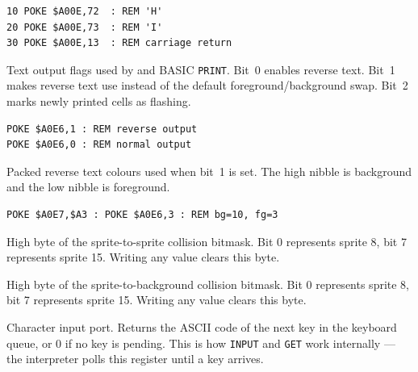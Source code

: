 \begin{lstlisting}
10 POKE $A00E,72  : REM 'H'
20 POKE $A00E,73  : REM 'I'
30 POKE $A00E,13  : REM carriage return
\end{lstlisting}



Text output flags used by  and BASIC \texttt{PRINT}. Bit~0 enables
reverse text. Bit~1 makes reverse text use  instead of the default
foreground/background swap. Bit~2 marks newly printed cells as flashing.

\begin{lstlisting}
POKE $A0E6,1 : REM reverse output
POKE $A0E6,0 : REM normal output
\end{lstlisting}



Packed reverse text colours used when  bit~1 is set. The high
nibble is background and the low nibble is foreground.

\begin{lstlisting}
POKE $A0E7,$A3 : POKE $A0E6,3 : REM bg=10, fg=3
\end{lstlisting}



High byte of the sprite-to-sprite collision bitmask.  Bit 0 represents sprite
8, bit 7 represents sprite 15.  Writing any value clears this byte.



High byte of the sprite-to-background collision bitmask.  Bit 0 represents
sprite 8, bit 7 represents sprite 15.  Writing any value clears this byte.



Character input port.  Returns the ASCII code of the next key in the keyboard
queue, or 0 if no key is pending.  This is how \texttt{INPUT} and \texttt{GET}
work internally --- the interpreter polls this register until a key arrives.


